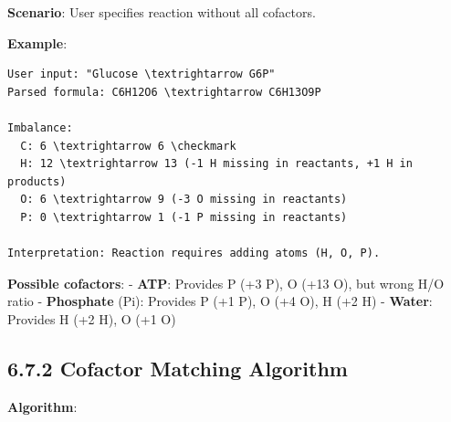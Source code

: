 \textbf{Scenario}: User specifies reaction without all cofactors.

\textbf{Example}:

\begin{lstlisting}
User input: "Glucose \textrightarrow G6P"
Parsed formula: C6H12O6 \textrightarrow C6H13O9P

Imbalance:
  C: 6 \textrightarrow 6 \checkmark
  H: 12 \textrightarrow 13 (-1 H missing in reactants, +1 H in products)
  O: 6 \textrightarrow 9 (-3 O missing in reactants)
  P: 0 \textrightarrow 1 (-1 P missing in reactants)

Interpretation: Reaction requires adding atoms (H, O, P).
\end{lstlisting}

\textbf{Possible cofactors}: - \textbf{ATP}: Provides P (+3 P), O (+13
O), but wrong H/O ratio - \textbf{Phosphate} (Pi): Provides P (+1 P), O
(+4 O), H (+2 H) - \textbf{Water}: Provides H (+2 H), O (+1 O)

\hypertarget{cofactor-matching-algorithm}{%
\subsection{6.7.2 Cofactor Matching
Algorithm}\label{cofactor-matching-algorithm}}

\textbf{Algorithm}:


